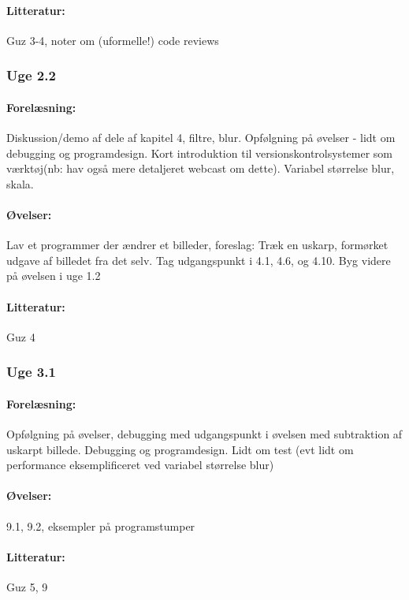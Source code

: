 \documentclass[12pt]{article}
\begin{document}
\paragraph{Litteratur:} Guz 3-4, noter om (uformelle!) code reviews

\subsubsection{Uge 2.2}
\paragraph{Forelæsning:} 

Diskussion/demo af dele af kapitel 4, filtre, blur.
Opfølgning på øvelser -  lidt om debugging og programdesign.
Kort introduktion til versionskontrolsystemer som værktøj(nb: hav også mere detaljeret webcast om dette).
Variabel størrelse blur, skala.

\paragraph{Øvelser:}
Lav et programmer der ændrer et billeder, foreslag:
Træk en uskarp, formørket udgave af billedet fra det selv. 
Tag udgangspunkt i 4.1, 4.6, og 4.10.
Byg videre på øvelsen i uge 1.2

\paragraph{Litteratur:} Guz 4
\subsubsection{Uge 3.1}
\paragraph{Forelæsning:} 
Opfølgning på øvelser, debugging med udgangspunkt i øvelsen med subtraktion af uskarpt billede.
Debugging og programdesign. Lidt om test
(evt lidt om performance eksemplificeret ved variabel størrelse blur)


\paragraph{Øvelser:}
9.1, 9.2, eksempler på programstumper
\paragraph{Litteratur:} Guz 5, 9
\end{document}
